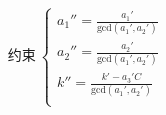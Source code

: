 \documentclass[preview]{standalone}
\begin{document}
\begin{align*}
\text{约束}~\begin{cases}a_1'' = \frac{a_1'}{\mathrm{gcd}(a_1', a_2')} \\a_2'' = \frac{a_2'}{\mathrm{gcd}(a_1', a_2')} \\k'' = \frac{k' - a_3' C}{\mathrm{gcd}(a_1', a_2')} \\\end{cases}
\end{align*}
\end{document}
